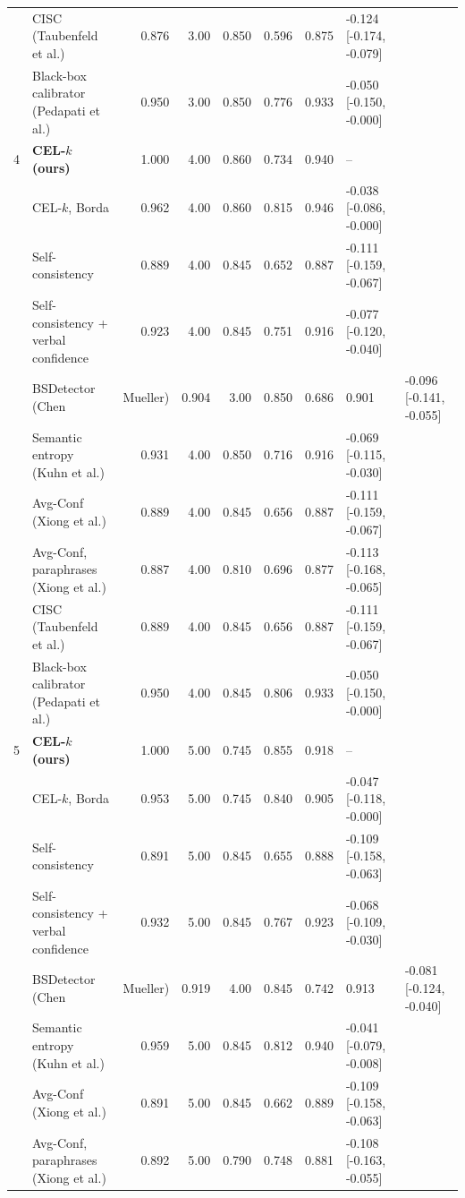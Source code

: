 \begin{table}[t]
\begin{tabular}{llrrrrrl}
 & CISC (Taubenfeld et al.) & 0.876 & 3.00 & 0.850 & 0.596 & 0.875 & -0.124 [-0.174, -0.079] \\
 & Black-box calibrator (Pedapati et al.) & 0.950 & 3.00 & 0.850 & 0.776 & 0.933 & -0.050 [-0.150, -0.000] \\
4 & \textbf{CEL-$k$ (ours)} & 1.000 & 4.00 & 0.860 & 0.734 & 0.940 & -- \\
 & \quad CEL-$k$, Borda & 0.962 & 4.00 & 0.860 & 0.815 & 0.946 & -0.038 [-0.086, -0.000] \\
 & Self-consistency & 0.889 & 4.00 & 0.845 & 0.652 & 0.887 & -0.111 [-0.159, -0.067] \\
 & Self-consistency + verbal confidence & 0.923 & 4.00 & 0.845 & 0.751 & 0.916 & -0.077 [-0.120, -0.040] \\
 & BSDetector (Chen & Mueller) & 0.904 & 3.00 & 0.850 & 0.686 & 0.901 & -0.096 [-0.141, -0.055] \\
 & Semantic entropy (Kuhn et al.) & 0.931 & 4.00 & 0.850 & 0.716 & 0.916 & -0.069 [-0.115, -0.030] \\
 & Avg-Conf (Xiong et al.) & 0.889 & 4.00 & 0.845 & 0.656 & 0.887 & -0.111 [-0.159, -0.067] \\
 & Avg-Conf, paraphrases (Xiong et al.) & 0.887 & 4.00 & 0.810 & 0.696 & 0.877 & -0.113 [-0.168, -0.065] \\
 & CISC (Taubenfeld et al.) & 0.889 & 4.00 & 0.845 & 0.656 & 0.887 & -0.111 [-0.159, -0.067] \\
 & Black-box calibrator (Pedapati et al.) & 0.950 & 4.00 & 0.845 & 0.806 & 0.933 & -0.050 [-0.150, -0.000] \\
5 & \textbf{CEL-$k$ (ours)} & 1.000 & 5.00 & 0.745 & 0.855 & 0.918 & -- \\
 & \quad CEL-$k$, Borda & 0.953 & 5.00 & 0.745 & 0.840 & 0.905 & -0.047 [-0.118, -0.000] \\
 & Self-consistency & 0.891 & 5.00 & 0.845 & 0.655 & 0.888 & -0.109 [-0.158, -0.063] \\
 & Self-consistency + verbal confidence & 0.932 & 5.00 & 0.845 & 0.767 & 0.923 & -0.068 [-0.109, -0.030] \\
 & BSDetector (Chen & Mueller) & 0.919 & 4.00 & 0.845 & 0.742 & 0.913 & -0.081 [-0.124, -0.040] \\
 & Semantic entropy (Kuhn et al.) & 0.959 & 5.00 & 0.845 & 0.812 & 0.940 & -0.041 [-0.079, -0.008] \\
 & Avg-Conf (Xiong et al.) & 0.891 & 5.00 & 0.845 & 0.662 & 0.889 & -0.109 [-0.158, -0.063] \\
 & Avg-Conf, paraphrases (Xiong et al.) & 0.892 & 5.00 & 0.790 & 0.748 & 0.881 & -0.108 [-0.163, -0.055] \\

\end{tabular}
\end{table}
